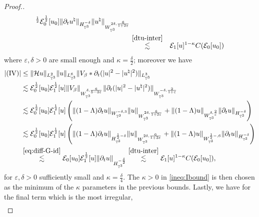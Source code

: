 \begin{proof}[Proof.]
\begin{eqnarray*}
    [u]^{\frac{1}{2}} \mathcal{E}^{\frac{1}{2}}_0 [u_0] \| \partial_t
    u^{\natural} \|_{H_{\mathbb{T}^3}^{- \delta}} \| u^{\natural}
    \|_{W_{\mathbb{T}^3}^{2 \delta, \frac{6}{1 + 2 \varepsilon}}}\\
    & \overset{\eqref{dtu-inter}}{\lesssim} & \mathcal{E}_1 [u]^{1 - \kappa}
    C (\mathcal{E}_0 [u_0])
  \end{eqnarray*}
  where $\varepsilon, \delta > 0$ are small enough and $\kappa =
  \frac{\delta}{2}$; moreover we have
  \begin{align*}
    | (\mathrm{IV}) | & \leq \| \mathcal{H} u \|_{L_{\mathbb{T}^3}^2} \| u
    \|_{L_{\mathbb{T}^3}^6} \| V_{\beta} \ast \partial_t (| u |^2 - |
    u^{\natural} |^2) \|_{L_{\mathbb{T}^3}^3}\\
    & \lesssim \mathcal{E}^{\frac{1}{2}}_0 [u_0]
    \mathcal{E}^{\frac{1}{2}}_1 [u] \| V_{\beta} \|_{W_{\mathbb{T}^3}^{\delta,
    \frac{6}{5 - 3 \varepsilon}}} \| \partial_t (| u |^2 - | u^{\natural} |^2)
    \|_{W_{\mathbb{T}^3}^{- \delta, \frac{2}{1 + \varepsilon}}}\\
    & \lesssim \mathcal{E}^{\frac{1}{2}}_0 [u_0]
    \mathcal{E}^{\frac{1}{2}}_1 [u] \left( \| (1 - \Lambda) \partial_t u
    \|_{W_{\mathbb{T}^3}^{- \delta, 3}} \| u \|_{{W_{\mathbb{T}^3}^{2 \delta,
    \frac{6}{1 + 3 \varepsilon}}} } + \| (1 - \Lambda) u
    \|_{W_{\mathbb{T}^3}^{\delta, \frac{2}{\varepsilon}}} \| \partial_t u
    \|_{H_{\mathbb{T}^3}^{- \delta}} \right)\\
    & \lesssim  \mathcal{E}^{\frac{1}{2}}_0 [u_0]
    \mathcal{E}^{\frac{1}{2}}_1 [u] \left( \| (1 - \Lambda) \partial_t u
    \|_{H_{\mathbb{T}^3}^{\frac{1}{2} - \delta}} \| u \|_{{W_{\mathbb{T}^3}^{2
    \delta, \frac{6}{1 + 3 \varepsilon}}} } + \| (1 - \Lambda) u
    \|_{W_{\mathbb{T}^3}^{\frac{1}{2} -, 6}} \| \partial_t u
    \|_{H_{\mathbb{T}^3}^{- \delta}} \right)\\
    & \overset{\eqref{eq:diff-G-id}}{\lesssim}  \mathcal{E}_0 [u_0]
    \mathcal{E}^{\frac{1}{2}}_1 [u] \| \partial_t u \|_{H_{\mathbb{T}^3}^{-
    \frac{\delta}{2}}} \overset{\eqref{dtu-inter}}{\lesssim} \mathcal{E}_1
    [u]^{1 - \kappa} C (\mathcal{E}_0 [u_0]),
  \end{align*}
  for $\varepsilon, \delta > 0$ sufficiently small and $\kappa =
  \frac{\delta}{4} .$ The $\kappa > 0$ in \eqref{ineq:Ibound} is then chosen
  as the minimum of the $\kappa$ parameters in the previous bounds. Lastly, we have for the final term which is the most irregular,
  \begin{eqnarray*}

\end{eqnarray*}
\end{proof}
